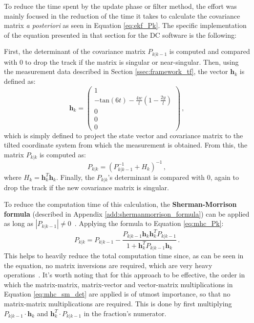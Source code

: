 To reduce the time spent by the update phase or filter method, the effort was mainly focused in the reduction of the time it takes to calculate the covariance matrix \textit{a posteriori} as seen in Equation \eqref{eq:ekf_Pk}.
The specific implementation of the equation presented in that section for the DC software is the following:

First, the determinant of the covariance matrix $P_{k|k-1}$ is computed and compared with $0$ to drop the track if the matrix is singular or near-singular.
Then, using the measurement data described in Section \ref{ssec:framework_tf}, the vector $\mathbf{h}_k$ is defined as:
    \begin{equation}
        \mathbf{h}_k = \begin{pmatrix}1\\ -\text{tan}(6t) - \frac{4w}{l}(1 - \frac{2y}{l})\\ 0\\ 0\\ 0\end{pmatrix}\,, \label{eq:mhc_hvec}
    \end{equation}
which is simply defined to project the state vector and covariance matrix to the tilted coordinate system from which the measurement is obtained.
From this, the matrix $P_{k|k}$ is computed as:
    \begin{equation}
        P_{k|k} = (P_{k|k-1}^{-1} + H_k)^{-1}\,, \label{eq:mhc_Pk}
    \end{equation}
where $H_k = \mathbf{h}_k^T\mathbf{h}_k$.
Finally, the $P_{k|k}$'s determinant is compared with $0$, again to drop the track if the new covariance matrix is singular.

To reduce the computation time of this calculation, the \textbf{Sherman-Morrison formula} (described in Appendix \ref{add:shermanmorrison_formula}) can be applied as long as $|P_{k|k-1}|\neq 0$~\cite{sherman1950adjustment}.
Applying the formula to Equation \eqref{eq:mhc_Pk}:
    \begin{equation}
        P_{k|k} = P_{k|k-1} - \frac{P_{k|k-1} \mathbf{h}_k \mathbf{h}_k^T P_{k|k-1}}{1 + \mathbf{h}_k^T P_{k|k-1} \mathbf{h}_k}\,. \label{eq:mhc_sm_det}
    \end{equation}
This helps to heavily reduce the total computation time since, as can be seen in the equation, no matrix inversions are required, which are very heavy operations~\cite{fatahalian2004understanding}.
It's worth noting that for this approach to be effective, the order in which the matrix-matrix, matrix-vector and vector-matrix multiplications in Equation \eqref{eq:mhc_sm_det} are applied is of utmost importance, so that no matrix-matrix multiplications are required.
This is done by first multiplying $P_{k|k-1}\cdot \mathbf{h}_k$ and $\mathbf{h}_k^T\cdot P_{k|k-1}$ in the fraction's numerator.


